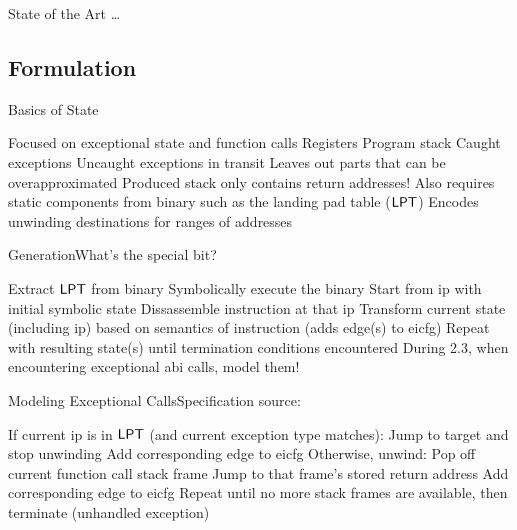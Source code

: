\begin{frame}{State of the Art}
  \todo\dots
\end{frame}

\subsection{Formulation}
\begin{frame}{Basics of State}
  \begin{outline}
    \1 Focused on \alert{exceptional state} and \alert{function calls}
      \2 Registers
      \2 Program stack
      \2 \alert{Caught} exceptions
      \2 \alert{Uncaught} exceptions in transit
    \1 Leaves out parts that can be overapproximated
      \2 Produced stack only contains return addresses!
    \1 Also requires static components from binary such as the \alert{landing pad table ($\operatorname{\mathsf{LPT}}$)}
      \2 Encodes unwinding destinations for ranges of addresses
  \end{outline}
\end{frame}

\begin{frame}{Generation}{What's the special bit?}
  \begin{outline}[enumerate]
    \1 Extract $\operatorname{\mathsf{LPT}}$ from binary
    \1 \alert{Symbolically execute} the binary
      \2 Start from \gls{ip} with initial \alert{symbolic state}
      \2 Dissassemble instruction at that \gls{ip}
      \2 Transform current state (including \gls{ip}) based on semantics of instruction (adds edge(s) to \gls{eicfg})
      \2 Repeat with resulting state(s) until termination conditions encountered
    \1 \alert{During 2.3, when encountering exceptional \gls{abi} calls, model them!}
  \end{outline}
\end{frame}

\begin{frame}{Modeling Exceptional  Calls}{Specification source: }
  \begin{block}{}
    \begin{outline}[enumerate]
      \1 If current \gls{ip} is in $\operatorname{\mathsf{LPT}}$ (and current exception type matches):
        \2 Jump to target and stop unwinding
        \2 Add corresponding edge to \gls{eicfg}
      \1 Otherwise, unwind:
        \2 Pop off current function call stack frame
        \2 Jump to that frame's stored return address
        \2 Add corresponding edge to \gls{eicfg}
      \1 Repeat until no more stack frames are available, then terminate (\alert{unhandled exception})
    \end{outline}
  \end{block}
\end{frame}

